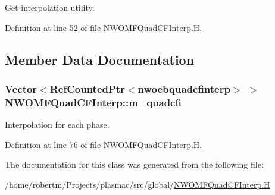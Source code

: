Get interpolation utility. 



Definition at line 52 of file N\+W\+O\+M\+F\+Quad\+C\+F\+Interp.\+H.



\subsection{Member Data Documentation}
\subsubsection[{\texorpdfstring{m\+\_\+quadcfi}{m_quadcfi}}]{\setlength{\rightskip}{0pt plus 5cm}Vector$<$Ref\+Counted\+Ptr$<${\bf nwoebquadcfinterp}$>$ $>$ N\+W\+O\+M\+F\+Quad\+C\+F\+Interp\+::m\+\_\+quadcfi\hspace{0.3cm}{\ttfamily [protected]}}\hypertarget{classNWOMFQuadCFInterp_a6c6c2277a8267c521d1a12a173170d98}{}\label{classNWOMFQuadCFInterp_a6c6c2277a8267c521d1a12a173170d98}


Interpolation for each phase. 



Definition at line 76 of file N\+W\+O\+M\+F\+Quad\+C\+F\+Interp.\+H.



The documentation for this class was generated from the following file\+:\begin{DoxyCompactItemize}
\item 
/home/robertm/\+Projects/plasmac/src/global/\hyperlink{NWOMFQuadCFInterp_8H}{N\+W\+O\+M\+F\+Quad\+C\+F\+Interp.\+H}\end{DoxyCompactItemize}
